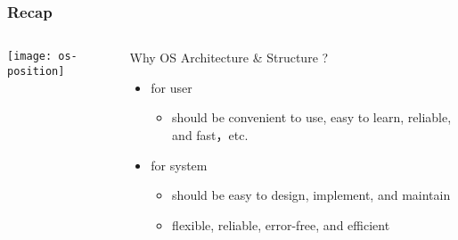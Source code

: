 %
%
\begin{frame}[plain]
	\frametitle{Recap}
	
	
	
	\begin{columns}
		
		\begin{column}{.4\textwidth}
			
			\texttt{[image: os-position]}
			
		\end{column}
		
		\begin{column}{.6\textwidth}
			
			\Large
			Why OS Architecture \& Structure ?
			\begin{itemize}
				\item for user
				\begin{itemize}\large
					\item should be convenient to use, easy to learn, reliable, and fast，etc.
				\end{itemize}
				\item for system
				\begin{itemize}\large
					\item should be easy to design, implement, and maintain
					\item flexible, reliable, error-free, and efficient
				\end{itemize}
			\end{itemize}	
			
		\end{column}
		
		
	\end{columns}
	
	
\end{frame}

